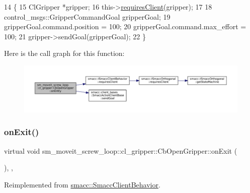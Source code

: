 \begin{DoxyCode}
14     \{
15         ClGripper *gripper;
16         this->\hyperlink{classsmacc_1_1ISmaccClientBehavior_a32b16e99e3b4cb289414203dc861a440}{requiresClient}(gripper);
17 
18         control\_msgs::GripperCommandGoal gripperGoal;
19         gripperGoal.command.position = 100;
20         gripperGoal.command.max\_effort = 100;
21         gripper->sendGoal(gripperGoal);
22     \}
\end{DoxyCode}
Here is the call graph for this function\+:
\nopagebreak
\begin{figure}[H]
\begin{center}
\leavevmode
\includegraphics[width=350pt]{classsm__moveit__screw__loop_1_1cl__gripper_1_1CbOpenGripper_af662bd9f6e0d190bcfc7f8d2168cee79_cgraph}
\end{center}
\end{figure}
\mbox{\label{classsm__moveit__screw__loop_1_1cl__gripper_1_1CbOpenGripper_a8d96045446ec442d9cb24bcf958eef03}} 
\subsubsection{\texorpdfstring{on\+Exit()}{onExit()}}
{\footnotesize\ttfamily virtual void sm\+\_\+moveit\+\_\+screw\+\_\+loop\+::cl\+\_\+gripper\+::\+Cb\+Open\+Gripper\+::on\+Exit (\begin{DoxyParamCaption}{ }\end{DoxyParamCaption})\hspace{0.3cm}{\ttfamily [inline]}, {\ttfamily [override]}, {\ttfamily [virtual]}}



Reimplemented from \hyperlink{classsmacc_1_1SmaccClientBehavior_a7e4fb6ce81ff96dc172425852d69c0c5}{smacc\+::\+Smacc\+Client\+Behavior}.



